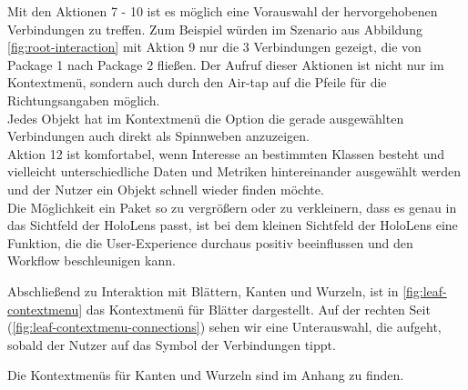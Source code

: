\noindent Mit den Aktionen 7 - 10 ist es möglich eine Vorauswahl der hervorgehobenen Verbindungen zu treffen. Zum Beispiel würden im Szenario aus Abbildung \ref{fig:root-interaction} mit Aktion 9 nur die 3 Verbindungen gezeigt, die von Package 1 nach Package 2 fließen. Der Aufruf dieser Aktionen ist nicht nur im Kontextmenü, sondern auch durch den Air-tap auf die Pfeile für die Richtungsangaben möglich. \\

\noindent Jedes Objekt hat im Kontextmenü die Option die gerade ausgewählten Verbindungen auch direkt als Spinnweben anzuzeigen.\\

\noindent Aktion 12 ist komfortabel, wenn Interesse an bestimmten Klassen besteht und vielleicht unterschiedliche Daten und Metriken hintereinander ausgewählt werden und der Nutzer ein Objekt schnell wieder finden möchte.\\

\noindent Die Möglichkeit ein Paket so zu vergrößern oder zu verkleinern, dass es genau in das Sichtfeld der HoloLens passt, ist bei dem kleinen Sichtfeld der HoloLens eine Funktion, die die User-Experience durchaus positiv beeinflussen und den Workflow beschleunigen kann.\\

\endgroup

Abschließend zu Interaktion mit Blättern, Kanten und Wurzeln, ist in \ref{fig:leaf-contextmenu} das Kontextmenü für  Blätter dargestellt. Auf der rechten Seit (\ref{fig:leaf-contextmenu-connections}) sehen wir eine Unterauswahl, die aufgeht, sobald der Nutzer auf das Symbol der Verbindungen tippt.

Die Kontextmenüs für Kanten und Wurzeln sind im Anhang zu finden.


